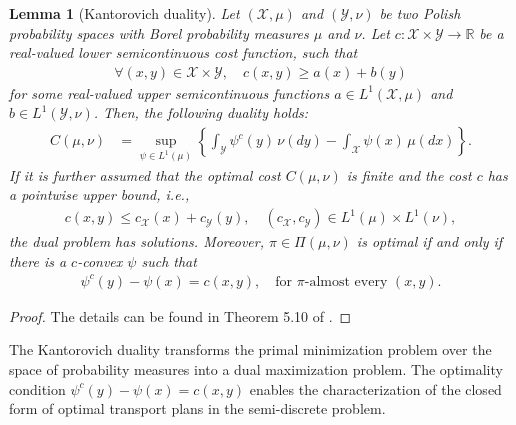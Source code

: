 \documentclass{article}
\theoremstyle{plain}
\newtheorem{lemma}[theorem]{Lemma}
\theoremstyle{definition}
\theoremstyle{remark}
\begin{document}
\begin{lemma}[Kantorovich duality]
	\label{lem:kantorovich-dual}
	Let $(\mathcal{X},\mu)$ and $(\mathcal{Y},\nu)$ be two Polish probability spaces with Borel probability measures $\mu$ and $\nu$. Let $c: \mathcal{X} \times \mathcal{Y} \to \mathbb{R}$ be a real-valued lower semicontinuous cost function, such that
	\begin{align*}
		\forall (x,y) \in \mathcal{X} \times \mathcal{Y}, \quad c(x,y) \geq a(x) + b(y) 
	\end{align*}
	for some real-valued upper semicontinuous functions $a \in L^1(\mathcal{X},\mu)$ and $b \in L^1(\mathcal{Y},\nu)$. Then, the following duality holds:
	\begin{align*}
		C(\mu,\nu) &= \sup_{\psi \in L^1(\mu)} \left\{\int_{\mathcal{Y}} \psi^c(y) \, \nu(dy) - \int_{\mathcal{X}} \psi(x) \, \mu(dx) \right\} .
	\end{align*}
	If it is further assumed that the optimal cost $C(\mu,\nu)$ is finite and the cost $c$ has a pointwise upper bound, i.e.,
	\begin{align*}
		c(x,y) \leq c_{\mathcal{X}}(x) + c_{\mathcal{Y}}(y), \quad (c_{\mathcal{X}},c_{\mathcal{Y}}) \in L^1(\mu) \times L^1(\nu) ,
	\end{align*}
	the dual problem has solutions. Moreover, $\pi \in \Pi(\mu, \nu)$ is optimal if and only if there is a $c$-convex $\psi$ such that
	\begin{align*}
		\psi^c(y) - \psi(x) = c(x,y) , \quad \text{for $\pi$-almost every $(x,y)$} .
	\end{align*}
\end{lemma}
\begin{proof}
	The details can be found in Theorem 5.10 of \citet{villani2008optimal}.
\end{proof}
The Kantorovich duality transforms the primal minimization problem over the space of probability measures into a dual maximization problem. The optimality condition $\psi^c(y) - \psi(x) = c(x,y)$ enables the characterization of the closed form of optimal transport plans in the semi-discrete problem.
\end{document}
